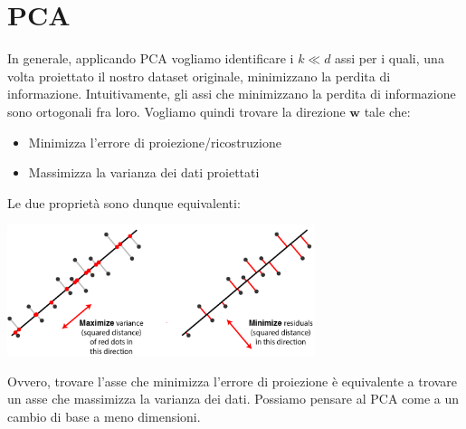 \documentclass{article}
\begin{document}
    \section{PCA}
        In generale, applicando PCA vogliamo identificare i $k \ll d$ assi per i quali, una volta proiettato il nostro dataset originale,
        minimizzano la perdita di informazione. Intuitivamente, gli assi che minimizzano la perdita di informazione sono ortogonali fra loro.
        Vogliamo quindi trovare la direzione $\mathbf{w}$ tale che:
        \begin{itemize}
            \item Minimizza l'errore di proiezione/ricostruzione
            \item Massimizza la varianza dei dati proiettati
        \end{itemize}
        Le due proprietà sono dunque equivalenti:
        \begin{center}\includegraphics[width=9cm]{pca_minmax.png}\end{center}
        Ovvero, trovare l'asse che minimizza l'errore di proiezione è equivalente a trovare un asse che massimizza la varianza 
        dei dati.
        Possiamo pensare al PCA come a un cambio di base a meno dimensioni.
\end{document}
